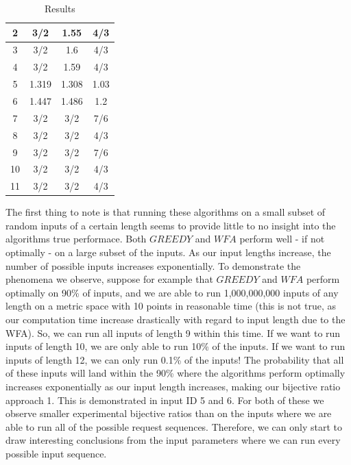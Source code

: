 \begin{table}[!htb]
\begin{minipage}{.5\linewidth}
\begin{tabular}{|c|c|c|c|}
          \hline
          2 & 3/2 & 1.55 & 4/3\\
          \hline
          3 & 3/2 & 1.6 & 4/3 \\
          \hline
          4 & 3/2 & 1.59 & 4/3 \\
          \hline
          5 & 1.319 & 1.308 & 1.03 \\
          \hline
          6 & 1.447 & 1.486 & 1.2 \\
          \hline
          7 & 3/2 & 3/2 & 7/6 \\
          \hline
          8 & 3/2 & 3/2 & 4/3 \\
          \hline
          9 & 3/2 & 3/2 & 7/6 \\
          \hline
          10 & 3/2 & 3/2 & 4/3 \\
          \hline
          11 & 3/2 & 3/2 & 4/3 \\
          \hline

      \end{tabular}
          \caption{Results}
          \label{tab:results}
    \end{minipage} 
\end{table}

The first thing to note is that running these algorithms on a small subset of random inputs of a certain length seems to provide little to no insight into the algorithms true performace. Both $GREEDY$ and $WFA$ perform well - if not optimally - on a large subset of the inputs. As our input lengths increase, the number of possible inputs increases exponentially. To demonstrate the phenomena we observe, suppose for example that $GREEDY$ and $WFA$ perform optimally on 90\% of inputs, and we are able to run 1,000,000,000 inputs of any length on a metric space with 10 points in reasonable time (this is not true, as our computation time increase drastically with regard to input length due to the WFA). So, we can run all inputs of length 9 within this time. If we want to run inputs of length 10, we are only able to run 10\% of the inputs. If we want to run inputs of length 12, we can only run 0.1\% of the inputs! The probability that all of these inputs will land within the 90\% where the algorithms perform optimally increases exponentially as our input length increases, making our bijective ratio approach 1. This is demonstrated in input ID 5 and 6. For both of these we observe smaller experimental bijective ratios than on the inputs where we are able to run all of the possible request sequences. Therefore, we can only start to draw interesting conclusions from the input parameters where we can run every possible input sequence.

